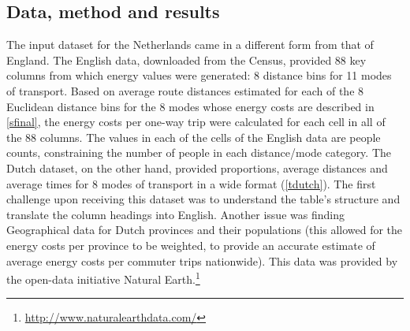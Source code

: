 \subsection{Data, method and results} \label{sdutchdata}
The input dataset for the Netherlands came in a different form from
that of England. The English data, downloaded from the Census,
provided 88 key columns from which energy values were generated:
8 distance bins for 11 modes of transport. Based on average route distances
estimated for each of the 8 Euclidean distance bins for the 8 modes whose
energy costs are described in \cref{sfinal}, the energy costs per one-way
trip were calculated for each cell in all of the 88 columns. The values in
each of the cells of the English data are people counts, constraining the
number of people in each distance/mode category.
The Dutch dataset, on the other hand, provided proportions, average distances
and average times for 8 modes of transport in a wide format (\cref{tdutch}).
The first challenge upon receiving this dataset was to understand the
table's structure and translate the column headings into English.
Another issue was finding Geographical data for Dutch provinces and their
populations (this allowed for the energy costs per province to be weighted,
to provide an accurate estimate of average energy costs per commuter trips
nationwide). This data was provided by the open-data initiative
Natural Earth.\footnote{\href{http://www.naturalearthdata.com/}
{http://www.naturalearthdata.com/}
}

